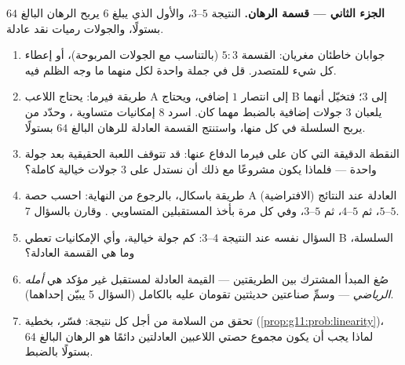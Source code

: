 \begin{problem}
\medskip
\noindent\textbf{الجزء الثاني --- قسمة الرهان.}
النتيجة $5$--$3$، والأول الذي يبلغ $6$ يربح الرهان البالغ $64$ بستولًا، والجولات
رميات نقد عادلة.
\begin{enumerate}[resume]
  \item جوابان خاطئان مغريان: القسمة $5 : 3$
        (بالتناسب مع الجولات المربوحة)، أو إعطاء كل شيء
        للمتصدر. قل في جملة واحدة لكل منهما ما وجه
        الظلم فيه.
  \item طريقة فيرما: يحتاج اللاعب A إلى انتصار $1$ إضافي، ويحتاج B إلى
        $3$؛ فتخيّل أنهما يلعبان $3$ جولات إضافية بالضبط مهما كان.
        اسرد $8$ إمكانيات متساوية ، وحدّد من يربح
        السلسلة في كل منها، واستنتج القسمة العادلة للرهان البالغ $64$
        بستولًا.
  \item النقطة الدقيقة التي كان على فيرما الدفاع عنها: قد تتوقف
        اللعبة الحقيقية بعد جولة واحدة --- فلماذا يكون مشروعًا
        مع ذلك أن نستدل على $3$ جولات خيالية كاملة؟
  \item طريقة باسكال، بالرجوع من النهاية: احسب حصة A
        العادلة عند النتائج (الافتراضية) $5$--$5$، ثم
        $5$--$4$، ثم $5$--$3$، وفي كل مرة بأخذ  المستقبلين
        المتساويي . وقارن بالسؤال 7.
  \item السؤال نفسه عند النتيجة $4$--$3$: كم جولة خيالية،
        وأي الإمكانيات تعطي B السلسلة، وما هي
        القسمة العادلة؟
  \item صُغ المبدأ المشترك بين الطريقتين --- القيمة العادلة
        لمستقبل غير مؤكد هي \emph{أمله الرياضي}
        --- وسمِّ صناعتين حديثتين تقومان عليه بالكامل
        (السؤال 5 يبيّن إحداهما).
  \item تحقق من السلامة من أجل كل نتيجة: فسّر، بخطية
        (\cref{prop:g11:prob:linearity})، لماذا يجب أن يكون مجموع
        حصتي اللاعبين العادلتين دائمًا هو
        الرهان البالغ $64$ بستولًا بالضبط.
\end{enumerate}


\end{problem}
